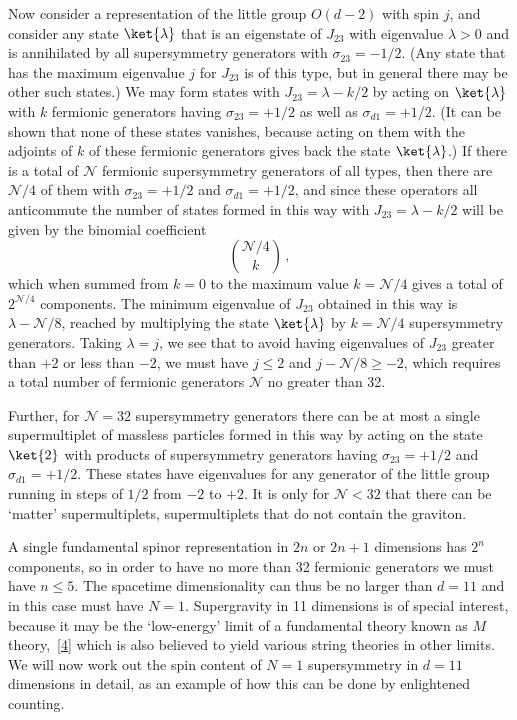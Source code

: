 Now consider a representation of the little group \(O(d-2)\) with spin
\(j\), and consider any state \(\ket{\lambda}\) that is an
eigenstate of \(J_{23}\) with eigenvalue \(\lambda>0\) and is annihilated
by all supersymmetry generators with \(\sigma_{23}=-1/2\). (Any state that
has the maximum eigenvalue \(j\) for \(J_{23}\) is of this type, but in
general there may be other such states.) We may form states with
\(J_{23}=\lambda-k/2\) by acting on \(\ket{\lambda}\) with \(k\)
fermionic generators having \(\sigma_{23}=+1/2\) as well as
\(\sigma_{d1}=+1/2\). (It can be shown that none of these states vanishes,
because acting on them with the adjoints of \(k\) of these fermionic
generators gives back the state \(\ket{\lambda}\).) If there is a
total of \(\mathcal N\) fermionic supersymmetry generators of all types,
then there are \(\mathcal N/4\) of them with \(\sigma_{23}=+1/2\) and
\(\sigma_{d1}=+1/2\), and since these operators all anticommute the number
of states formed in this way with \(J_{23}=\lambda-k/2\) will be given by
the binomial coefficient
\begin{equation}
  \binom{\mathcal N/4}{k}\,,
  \tag{32.2.1}\label{eq:32.2.1}
\end{equation}
which when summed from \(k=0\) to the maximum value \(k=\mathcal N/4\)
gives a total of \(2^{\mathcal N/4}\) components. The minimum eigenvalue
of \(J_{23}\) obtained in this way is \(\lambda-\mathcal N/8\), reached
by multiplying the state \(\ket{\lambda}\) by \(k=\mathcal N/4\)
supersymmetry generators. Taking \(\lambda=j\), we see that to avoid
having eigenvalues of \(J_{23}\) greater than \(+2\) or less than \(-2\),
we must have \(j\leq2\) and \(j-\mathcal N/8\geq-2\), which requires a
total number of fermionic generators \(\mathcal N\) no greater than 32.

Further, for \(\mathcal N=32\) supersymmetry generators there can be at
most a single supermultiplet of massless particles formed in this way by
acting on the state \(\ket{2}\) with products of supersymmetry
generators having \(\sigma_{23}=+1/2\) and \(\sigma_{d1}=+1/2\). These
states have eigenvalues for any generator of the little group running in
steps of \(1/2\) from \(-2\) to \(+2\). It is only for
\(\mathcal N<32\) that there can be `matter' supermultiplets,
supermultiplets that do not contain the graviton.

A single fundamental spinor representation in \(2n\) or \(2n+1\)
dimensions has \(2^n\) components, so in order to have no more than 32
fermionic generators we must have \(n\leq5\). The spacetime dimensionality
can thus be no larger than \(d=11\) and in this case must have \(N=1\).
Supergravity in 11 dimensions is of special interest, because it may be
the `low-energy' limit of a fundamental theory known as
\(M\) theory,~\hyperref[ch32-ref-4]{[4]} which is also believed to yield
various string theories in other limits. We will now work out the spin
content of \(N=1\) supersymmetry in \(d=11\) dimensions in detail, as an
example of how this can be done by enlightened counting.

